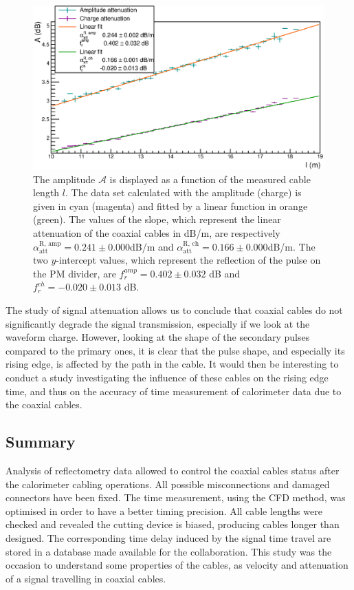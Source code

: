 \begin{figure}[h!]
  \centering
  \includegraphics[width=15cm]{commissioning/fig_commissioning/attenuation_length.eps}
  \caption{The amplitude $\mathcal{A}$ is displayed as a function of the measured cable length $l$.
    The data set calculated with the amplitude (charge) is given in cyan (magenta) and fitted by a linear function in orange (green).
    The values of the slope, which represent the linear attenuation of the coaxial cables in dB/m, are respectively $\alpha_{\text{att}}^{\text{R, amp}} = 0.241\pm 0.000$dB/m and $\alpha_{\text{att}}^{\text{R, ch}} = 0.166\pm0.000$dB/m.
    The two $y$-intercept values, which represent the reflection of the pulse on the PM divider, are $f_{r}^{amp} = 0.402\pm 0.032$ dB and $f_{r}^{ch} = -0.020\pm 0.013$ dB.
    \label{fig:attenuation}}
\end{figure}

The study of signal attenuation allows us to conclude that coaxial cables do not significantly degrade the signal transmission, especially if we look at the waveform charge.
However, looking at the shape of the secondary pulses compared to the primary ones, it is clear that the pulse shape, and especially its rising edge, is affected by the path in the cable.
It would then be interesting to conduct a study investigating the influence of these cables on the rising edge time, and thus on the accuracy of time measurement of calorimeter data due to the coaxial cables.

\subsection{Summary}

Analysis of reflectometry data allowed to control the coaxial cables status after the calorimeter cabling operations.
All possible misconnections and damaged connectors have been fixed.
The time measurement, using the CFD method, was optimised in order to have a better timing precision.
All cable lengths were checked and revealed the cutting device is biased, producing cables longer than designed.
The corresponding time delay induced by the signal time travel are stored in a database made available for the collaboration.
This study was the occasion to understand some properties of the cables, as velocity and attenuation of a signal travelling in coaxial cables.

